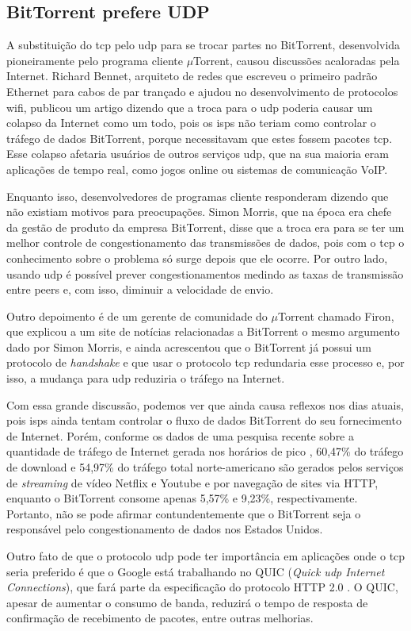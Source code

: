 
\subsection*{BitTorrent prefere UDP}

A substituição do \gls*{tcp} pelo \gls*{udp} para se trocar partes no BitTorrent,
desenvolvida pioneiramente pelo programa cliente $\mu$Torrent, causou discussões
acaloradas pela Internet. Richard Bennet, arquiteto de redes que escreveu o primeiro
padrão Ethernet para cabos de par trançado e ajudou no desenvolvimento de protocolos
wifi, publicou um artigo \cite{site:register-bennett} dizendo que a troca para o
\gls*{udp} poderia causar um colapso da Internet como um todo, pois os \glspl*{isp} não
teriam como controlar o tráfego de dados BitTorrent, porque necessitavam que estes
fossem pacotes \gls*{tcp}. Esse colapso afetaria usuários de outros serviços
\gls*{udp}, que na sua maioria eram aplicações de tempo real, como jogos online ou
sistemas de comunicação VoIP.

Enquanto isso, desenvolvedores de programas cliente responderam dizendo que não existiam
motivos para preocupações. Simon Morris, que na época era chefe da gestão de produto da
empresa BitTorrent, disse \cite{site:dslreports-bennett} que a troca era para se ter um
melhor controle de congestionamento das transmissões de dados, pois com o \gls*{tcp} o
conhecimento sobre o problema só surge depois que ele ocorre. Por outro lado, usando
\gls*{udp} é possível prever congestionamentos medindo as taxas de transmissão entre
\glspl*{peer} e, com isso, diminuir a velocidade de envio.

Outro depoimento é de um gerente de comunidade do $\mu$Torrent chamado Firon, que
explicou a um site de notícias relacionadas a BitTorrent
\cite{site:torrentfreak-bennett} o mesmo argumento dado por Simon Morris, e ainda
acrescentou que o BitTorrent já possui um protocolo de \emph{handshake} e que usar o
protocolo \gls*{tcp} redundaria esse processo e, por isso, a mudança para \gls*{udp}
reduziria o tráfego na Internet.

Com essa grande discussão, podemos ver que ainda causa reflexos nos dias atuais, pois
\glspl*{isp} ainda tentam controlar o fluxo de dados BitTorrent do seu fornecimento de
Internet. Porém, conforme os dados de uma pesquisa recente sobre a quantidade de
tráfego de Internet gerada nos horários de pico \cite{report:internet-usage-2013},
60,47\% do tráfego de download e 54,97\% do tráfego total norte-americano são gerados
pelos serviços de \emph{streaming} de vídeo Netflix e Youtube e por navegação de sites
via HTTP, enquanto o BitTorrent consome apenas 5,57\% e 9,23\%, respectivamente.
Portanto, não se pode afirmar contundentemente que o BitTorrent seja o responsável pelo
congestionamento de dados nos Estados Unidos.

Outro fato de que o protocolo \gls*{udp} pode ter importância em aplicações onde o
\gls*{tcp} seria preferido é que o Google está trabalhando no QUIC
(\emph{Quick \gls*{udp} Internet Connections}), que fará parte da especificação do
protocolo HTTP 2.0 \cite{site:chromium-quic}. O QUIC, apesar de aumentar o consumo de
banda, reduzirá o tempo de resposta de confirmação de recebimento de pacotes, entre
outras melhorias.